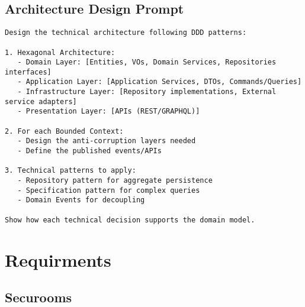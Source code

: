 \subsection{Architecture Design Prompt}\label{app:technical-architecture-prompt}
\begin{verbatim}
Design the technical architecture following DDD patterns:

1. Hexagonal Architecture:
   - Domain Layer: [Entities, VOs, Domain Services, Repositories interfaces]
   - Application Layer: [Application Services, DTOs, Commands/Queries]
   - Infrastructure Layer: [Repository implementations, External service adapters]
   - Presentation Layer: [APIs (REST/GRAPHQL)]

2. For each Bounded Context:
   - Design the anti-corruption layers needed
   - Define the published events/APIs

3. Technical patterns to apply:
   - Repository pattern for aggregate persistence
   - Specification pattern for complex queries
   - Domain Events for decoupling

Show how each technical decision supports the domain model.

\end{verbatim}

\section{Requirments}

\subsection{Securooms}

